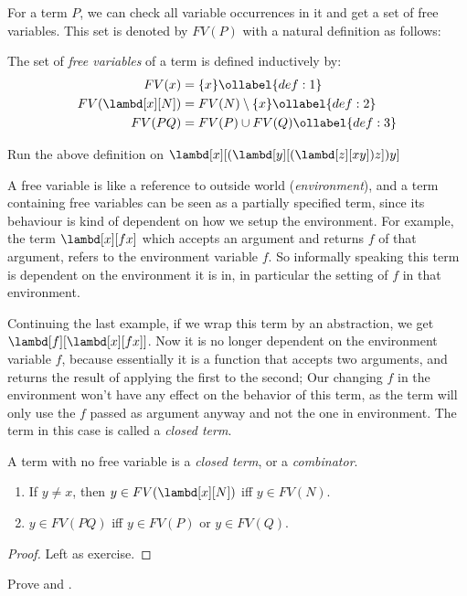 \documentclass[../../../include/open-logic-section]{subfiles}
\begin{document}
For a term $P$, we can check all variable occurrences in it and get a set of free
variables. This set is denoted by $FV(P)$ with a natural definition
as follows:

\begin{defn} 
  The set of \emph{free variables} of a term is defined inductively by:
  \begin{align} 
    FV(x) &= \{x\} \ollabel{def:1} \\
    FV(\lambd[x][N]) &= FV(N) \setminus \{x\}    \ollabel{def:2} \\
    FV(PQ) &= FV(P) \cup FV(Q) \ollabel{def:3}
  \end{align}
\end{defn}

\begin{prob}
  Run the above definition on $\lambd[x][(\lambd[y][(\lambd[z][x y]) z]) y]$
\end{prob}

\begin{explain}
A free variable is like a reference to outside world (\emph{environment}), and a term
containing free variables can be seen as a partially specified term,
since its behaviour is kind of dependent on how we setup the
environment. For example, the term $\lambd[x][f x]$ which
accepts an argument and returns $f$ of that argument, refers to the environment variable
$f$. So informally speaking this term is dependent on the environment
it is in, in particular the setting of $f$ in that environment.

Continuing the last example, if we wrap this term by an abstraction, we get
$\lambd[f][\lambd[x][f x]]$. Now it is no longer dependent on
the environment variable $f$, because essentially it is a function that
accepts two arguments, and returns the result of applying the first to
the second; Our changing $f$ in the environment won't have any
effect on the behavior of this term, as the term will only use the $f$
passed as argument anyway and not the one in environment. The term
in this case is called a \emph{closed term}.
\end{explain}

\begin{defn}
  A term with no free variable is a \emph{closed term}, or a \emph{combinator}.
\end{defn}

\begin{lem}
  \begin{enumerate}
    \item {} If $y \neq x$, then $y \in FV(\lambd[x][N])$ iff $y \in
    FV(N)$.
    \item {} $y \in FV(PQ)$ iff $y \in FV(P)$ or
      $y \in FV(Q)$.
    \end{enumerate}
\end{lem}
\begin{proof}
  Left as exercise.
\end{proof}

\begin{prob}
  Prove  and .
\end{prob}
\end{document}
